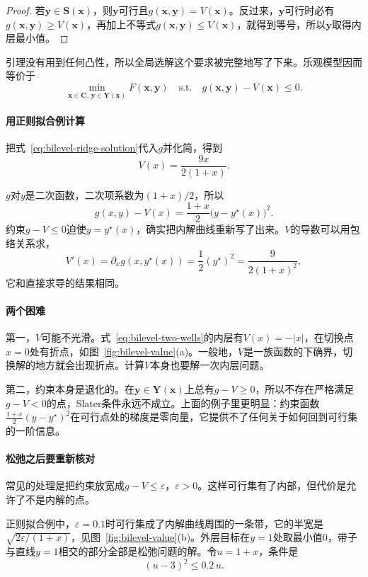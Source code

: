 \begin{proof}
若$\bm{y}\in\bm{S}(\bm{x})$，则$\bm{y}$可行且$g(\bm{x},\bm{y})=V(\bm{x})$。反过来，$\bm{y}$可行时必有$g(\bm{x},\bm{y})\geq V(\bm{x})$，再加上不等式$g(\bm{x},\bm{y})\leq V(\bm{x})$，就得到等号，所以$\bm{y}$取得内层最小值。
\end{proof}

引理没有用到任何凸性，所以全局选解这个要求被完整地写了下来。乐观模型因而等价于
\[
 \min_{\bm{x}\in\bm{C},\,\bm{y}\in\bm{Y}(\bm{x})}F(\bm{x},\bm{y})\quad\text{s.t.}\quad g(\bm{x},\bm{y})-V(\bm{x})\leq0.
\]

\paragraph{用正则拟合例计算}
把式~\eqref{eq:bilevel-ridge-solution}代入$g$并化简，得到
\[
 V(x)=\frac{9x}{2(1+x)}.
\]

$g$对$y$是二次函数，二次项系数为$(1+x)/2$，所以
\[
 g(x,y)-V(x)=\frac{1+x}{2}\bigl(y-y^\star(x)\bigr)^2.
\]
约束$g-V\leq0$迫使$y=y^\star(x)$，确实把内解曲线重新写了出来。$V$的导数可以用包络关系求，
\[
 V'(x)=\partial_xg(x,y^\star(x))=\frac12(y^\star)^2=\frac{9}{2(1+x)^2},
\]
它和直接求导的结果相同。

\paragraph{两个困难}
第一，$V$可能不光滑。式~\eqref{eq:bilevel-two-wells}的内层有$V(x)=-\lvert x\rvert$，在切换点$x=0$处有折点，如图~\ref{fig:bilevel-value}(a)。一般地，$V$是一族函数的下确界，切换解的地方就会出现折点。计算$V$本身也要解一次内层问题。

第二，约束本身是退化的。在$\bm{y}\in\bm{Y}(\bm{x})$上总有$g-V\geq0$，所以不存在严格满足$g-V<0$的点，Slater条件永远不成立。上面的例子里更明显：约束函数$\frac{1+x}{2}(y-y^\star)^2$在可行点处的梯度是零向量，它提供不了任何关于如何回到可行集的一阶信息。

\paragraph{松弛之后要重新核对}
常见的处理是把约束放宽成$g-V\leq\varepsilon$，$\varepsilon>0$。这样可行集有了内部，但代价是允许了不是内解的点。

正则拟合例中，$\varepsilon=0.1$时可行集成了内解曲线周围的一条带，它的半宽是$\sqrt{2\varepsilon/(1+x)}$，见图~\ref{fig:bilevel-value}(b)。外层目标在$y=1$处取最小值$0$，带子与直线$y=1$相交的部分全部是松弛问题的解。令$u=1+x$，条件是
\[
 (u-3)^2\leq0.2\,u.
\]


